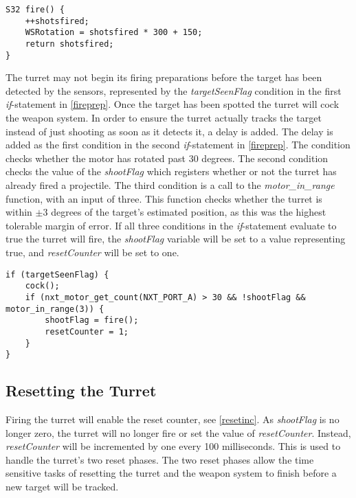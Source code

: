\begin{lstlisting}[style=customc, label={firefunc}, caption={Fire function}]
S32 fire() {
    ++shotsfired;
    WSRotation = shotsfired * 300 + 150;
    return shotsfired;
}
\end{lstlisting}

The turret may not begin its firing preparations before the target has been detected by the sensors, represented by the \emph{targetSeenFlag} condition in the first \emph{if}-statement in \cref{fireprep}. Once the target has been spotted the turret will cock the weapon system. In order to ensure the turret actually tracks the target instead of just shooting as soon as it detects it, a delay is added. The delay is added as the first condition in the second \emph{if}-statement in \cref{fireprep}. The condition checks whether the motor has rotated past 30 degrees. The second condition checks the value of the \emph{shootFlag} which registers whether or not the turret has already fired a projectile. The third condition is a call to the \emph{motor\_in\_range} function, with an input of three. This function checks whether the turret is within $\pm 3$ degrees of the target's estimated position, as this was the highest tolerable margin of error. If all three conditions in the \emph{if}-statement evaluate to true the turret will fire, the \emph{shootFlag} variable will be set to a value representing true, and \emph{resetCounter} will be set to one.

\begin{lstlisting}[style=customc, label={fireprep}, caption={Ready to fire}]
if (targetSeenFlag) {
    cock();
    if (nxt_motor_get_count(NXT_PORT_A) > 30 && !shootFlag && motor_in_range(3)) {
        shootFlag = fire();
        resetCounter = 1;
    }
}
\end{lstlisting}

\subsection{Resetting the Turret}
Firing the turret will enable the reset counter, see \cref{resetinc}. As \emph{shootFlag} is no longer zero, the turret will no longer fire or set the value of \emph{resetCounter}. Instead, \emph{resetCounter} will be incremented by one every 100 milliseconds. This is used to handle the turret's two reset phases. The two reset phases allow the time sensitive tasks of resetting the turret and the weapon system to finish before a new target will be tracked.

